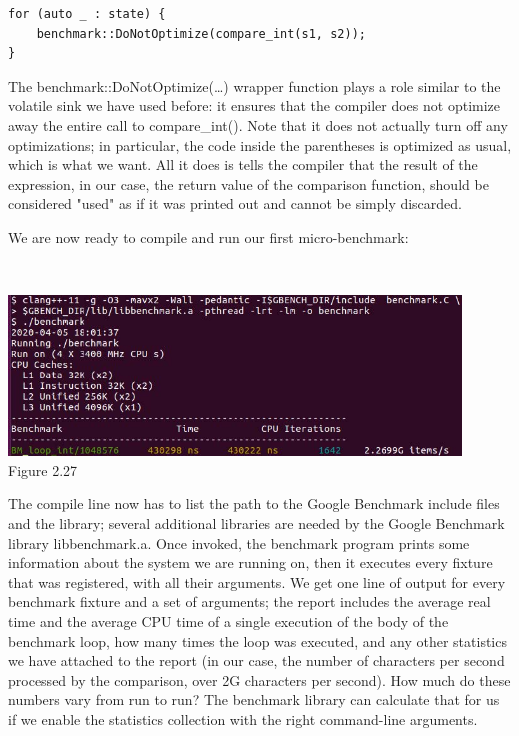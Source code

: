 \begin{lstlisting}[style=styleCXX]
for (auto _ : state) {
	benchmark::DoNotOptimize(compare_int(s1, s2));
}
\end{lstlisting}

The benchmark::DoNotOptimize(…) wrapper function plays a role similar to the volatile sink we have used before: it ensures that the compiler does not optimize away the entire call to compare\_int(). Note that it does not actually turn off any optimizations; in particular, the code inside the parentheses is optimized as usual, which is what we want. All it does is tells the compiler that the result of the expression, in our case, the return value of the comparison function, should be considered "used" as if it was printed out and cannot be simply discarded.

We are now ready to compile and run our first micro-benchmark:

\hspace*{\fill} \\ %
\begin{center}
\includegraphics[width=0.9\textwidth]{content/1/chapter2/images/27.jpg}\\
Figure 2.27
\end{center}

The compile line now has to list the path to the Google Benchmark include files and the library; several additional libraries are needed by the Google Benchmark library libbenchmark.a. Once invoked, the benchmark program prints some information about the system we are running on, then it executes every fixture that was registered, with all their arguments. We get one line of output for every benchmark fixture and a set of arguments; the report includes the average real time and the average CPU time of a single execution of the body of the benchmark loop, how many times the loop was executed, and any other statistics we have attached to the report (in our case, the number of characters per second processed by the comparison, over 2G characters per second). How much do these numbers vary from run to run? The benchmark library can calculate that for us if we enable the statistics collection with the right command-line arguments.

